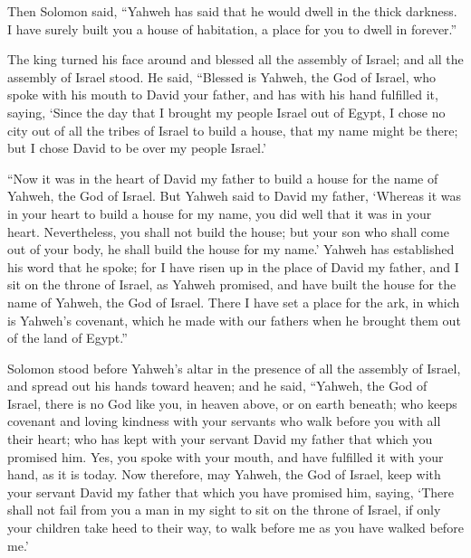  Then Solomon said, ``Yahweh has said that he would dwell
in the thick darkness.  I have surely built you a house of
habitation, a place for you to dwell in forever.''

 The king turned his face around and blessed all the
assembly of Israel; and all the assembly of Israel stood. 
He said, ``Blessed is Yahweh, the God of Israel, who spoke with his
mouth to David your father, and has with his hand fulfilled it, saying,
 `Since the day that I brought my people Israel out of
Egypt, I chose no city out of all the tribes of Israel to build a house,
that my name might be there; but I chose David to be over my people
Israel.'

 ``Now it was in the heart of David my father to build a
house for the name of Yahweh, the God of Israel.  But
Yahweh said to David my father, `Whereas it was in your heart to build a
house for my name, you did well that it was in your heart. 
Nevertheless, you shall not build the house; but your son who shall come
out of your body, he shall build the house for my name.' 
Yahweh has established his word that he spoke; for I have risen up in
the place of David my father, and I sit on the throne of Israel, as
Yahweh promised, and have built the house for the name of Yahweh, the
God of Israel.  There I have set a place for the ark, in
which is Yahweh's covenant, which he made with our fathers when he
brought them out of the land of Egypt.''

 Solomon stood before Yahweh's altar in the presence of all
the assembly of Israel, and spread out his hands toward heaven;
 and he said, ``Yahweh, the God of Israel, there is no God
like you, in heaven above, or on earth beneath; who keeps covenant and
loving kindness with your servants who walk before you with all their
heart;  who has kept with your servant David my father that
which you promised him. Yes, you spoke with your mouth, and have
fulfilled it with your hand, as it is today.  Now
therefore, may Yahweh, the God of Israel, keep with your servant David
my father that which you have promised him, saying, `There shall not
fail from you a man in my sight to sit on the throne of Israel, if only
your children take heed to their way, to walk before me as you have
walked before me.'


